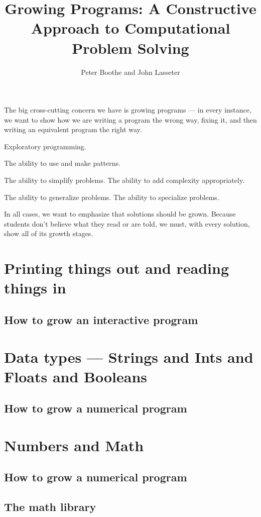 \documentclass{book}
\title{Growing Programs: A Constructive Approach to Computational Problem Solving}
\author{Peter Boothe and John Lasseter}
\begin{document}
\maketitle

The big cross-cutting concern we have is growing programs --- in every
instance, we want to show how we are writing a program the wrong way, fixing
it, and then writing an equivalent program the right way.

Exploratory programming.

The ability to use and make patterns.

The ability to simplify problems.
The ability to add complexity appropriately.

The ability to generalize problems.
The ability to specialize problems.

In all cases, we want to emphasize that solutions should be grown.  Because
students don't believe what they read or are told, we must, with every
solution, show all of its growth stages.

\tableofcontents
\chapter{Printing things out and reading things in}
\section{How to grow an interactive program}

\chapter{Data types --- Strings and Ints and Floats and Booleans}
\section{How to grow a numerical program}

\chapter{Numbers and Math}
\section{How to grow a numerical program}
\section{The math library}
\end{document}
